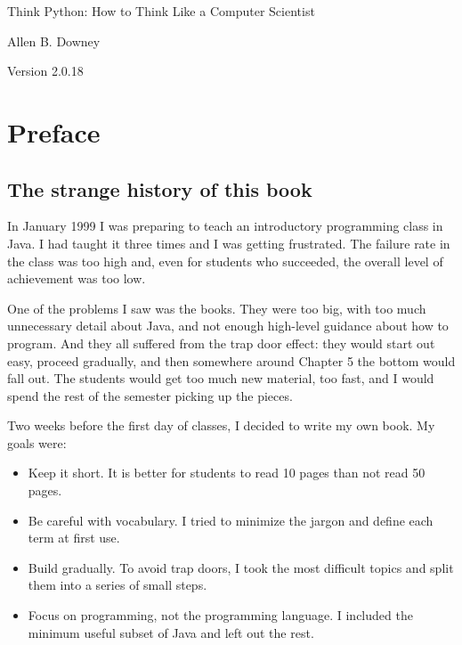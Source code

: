 \documentclass[10pt]{book}
\newcommand{\thetitle}{Think Python: How to Think Like a Computer Scientist}
\newcommand{\theversion}{2.0.18}
\newcommand{\thedate}{}
\begin{document}

\begin{htmlonly}


{\Large \thetitle}

{\large Allen B. Downey}

Version \theversion

\thedate

\setcounter{chapter}{-1}

\end{htmlonly}

\fi


\chapter{Preface}

\section*{The strange history of this book}

In January 1999 I was preparing to teach an introductory programming
class in Java.  I had taught it three times and I was getting
frustrated.  The failure rate in the class was too high and, even for
students who succeeded, the overall level of achievement was too low.

One of the problems I saw was the books.  
They were too big, with too much unnecessary detail about Java, and
not enough high-level guidance about how to program.  And they all
suffered from the trap door effect: they would start out easy,
proceed gradually, and then somewhere around Chapter 5 the bottom would
fall out.  The students would get too much new material, too fast,
and I would spend the rest of the semester picking up the pieces.

Two weeks before the first day of classes, I decided to write my
own book.  
My goals were:

\begin{itemize}

\item Keep it short.  It is better for students to read 10 pages
than not read 50 pages.

\item Be careful with vocabulary.  I tried to minimize the jargon
and define each term at first use.

\item Build gradually. To avoid trap doors, I took the most difficult
topics and split them into a series of small steps. 

\item Focus on programming, not the programming language.  I included
the minimum useful subset of Java and left out the rest.

\end{itemize}
\end{document}
